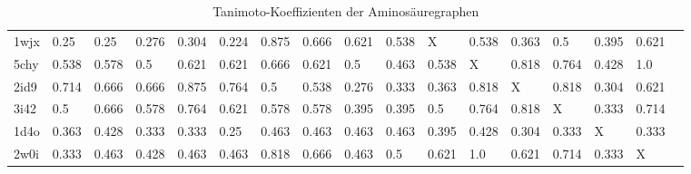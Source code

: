 \documentclass{report}
\begin{document}
\begin{table}
{\begin{tabular}{l l l l l l l l l l l l l l l l l}
1wjx & 0.25 & 0.25 & 0.276 & 0.304 & 0.224 & \cellcolor{fGreen!100}0.875 & \cellcolor{fGreen!75}0.666 & \cellcolor{fGreen!50}0.621 & 0.538 &   X   & 0.538 & 0.363 & 0.5 & 0.395 & \cellcolor{fGreen!25}0.621 &  \\
5chy & 0.538 & 0.578 & 0.5 & 0.621 & 0.621 & \cellcolor{fGreen!25}0.666 & 0.621 & 0.5 & 0.463 & 0.538 &   X   & \cellcolor{fGreen!75}0.818 & \cellcolor{fGreen!50}0.764 & 0.428 & \cellcolor{fGreen!100}1.0 &  \\
2id9 & 0.714 & 0.666 & 0.666 & \cellcolor{fGreen!100}0.875 & \cellcolor{fGreen!25}0.764 & 0.5 & 0.538 & 0.276 & 0.333 & 0.363 & \cellcolor{fGreen!75}0.818 &   X   & \cellcolor{fGreen!50}0.818 & 0.304 & 0.621 &  \\
3i42 & 0.5 & 0.666 & 0.578 & \cellcolor{fGreen!50}0.764 & 0.621 & 0.578 & 0.578 & 0.395 & 0.395 & 0.5 & \cellcolor{fGreen!75}0.764 & \cellcolor{fGreen!100}0.818 &   X   & 0.333 & \cellcolor{fGreen!25}0.714 &  \\
1d4o & 0.363 & 0.428 & 0.333 & 0.333 & 0.25 & \cellcolor{fGreen!25}0.463 & \cellcolor{fGreen!50}0.463 & \cellcolor{fGreen!100}0.463 & \cellcolor{fGreen!75}0.463 & 0.395 & 0.428 & 0.304 & 0.333 &   X   & 0.333 &  \\
2w0i & 0.333 & 0.463 & 0.428 & 0.463 & 0.463 & \cellcolor{fGreen!75}0.818 & \cellcolor{fGreen!25}0.666 & 0.463 & 0.5 & 0.621 & \cellcolor{fGreen!100}1.0 & 0.621 & \cellcolor{fGreen!50}0.714 & 0.333 &   X   &  \\


\end{tabular}}
\caption{Tanimoto-Koeffizienten der Aminos\"auregraphen}
\end{table}
\end{document}
